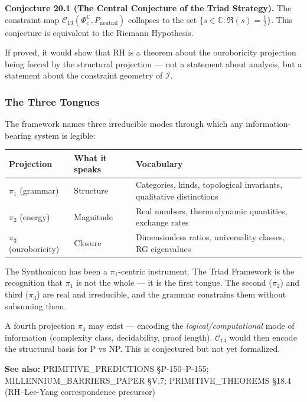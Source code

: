 \documentclass[12pt,a4paper]{article}
\newcommand{\pilcrow}{\S}
\begin{document}
\textbf{Conjecture 20.1 (The Central Conjecture of the Triad Strategy).} The constraint map $\mathcal{C}_{13}(\Phi_c^{\mathbb{C}}, P_\text{neutral})$ collapses to the set $\{ s \in \mathbb{C} : \Re(s) = \tfrac{1}{2} \}$. This conjecture is equivalent to the Riemann Hypothesis.

If proved, it would show that RH is a theorem about the ouroboricity projection being forced by the structural projection --- not a statement about analysis, but a statement about the constraint geometry of $\mathcal{I}$.

\subsubsection{The Three Tongues}

The framework names three irreducible modes through which any information-bearing system is legible:

\begin{table}[htbp]
\centering
\small
{}
\begin{tabularx}{\textwidth}{>{\centering\arraybackslash}X >{\centering\arraybackslash}X >{\centering\arraybackslash}X}
\toprule
\rowcolor{gray!25}\textbf{Projection} & \textbf{What it speaks} & \textbf{Vocabulary} \\
\midrule
\rowcolors{1}{white}{gray!10}
$\pi_1$ (grammar) & Structure & Categories, kinds, topological invariants, qualitative distinctions \\
$\pi_2$ (energy) & Magnitude & Real numbers, thermodynamic quantities, exchange rates \\
$\pi_3$ (ouroboricity) & Closure & Dimensionless ratios, universality classes, RG eigenvalues \\
\bottomrule
\end{tabularx}
\end{table}

The Synthonicon has been a $\pi_1$-centric instrument. The Triad Framework is the recognition that $\pi_1$ is not the whole --- it is the first tongue. The second ($\pi_2$) and third ($\pi_3$) are real and irreducible, and the grammar constrains them without subsuming them.

A fourth projection $\pi_4$ may exist --- encoding the \emph{logical/computational} mode of information (complexity class, decidability, proof length). $\mathcal{C}_{14}$ would then encode the structural basis for P vs NP. This is conjectured but not yet formalized.

\textbf{See also:} PRIMITIVE\_PREDICTIONS \pilcrow{}P-150--P-155; MILLENNIUM\_BARRIERS\_PAPER \pilcrow{}V.7; PRIMITIVE\_THEOREMS \pilcrow{}18.4 (RH--Lee-Yang correspondence precursor)
\end{document}
